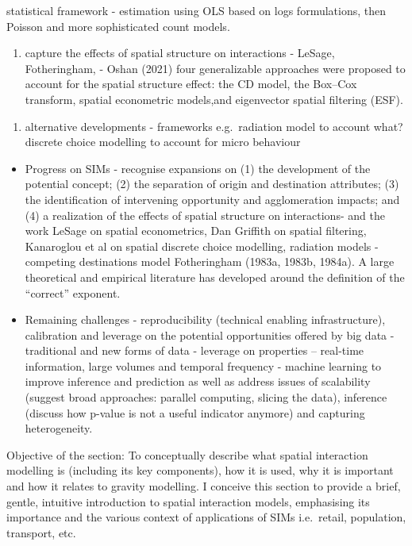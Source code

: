 \documentclass[11pt,letterpaper]{article}
\providecommand{\tightlist}{%
  \setlength{\itemsep}{0pt}\setlength{\parskip}{0pt}}
\begin{document}
statistical framework - estimation using OLS based on logs formulations, then Poisson and more sophisticated count models.

\begin{enumerate}
\def\labelenumi{(\arabic{enumi})}
\tightlist
\item
  capture the effects of spatial structure on interactions - LeSage, Fotheringham, - Oshan (2021) four generalizable approaches were proposed to account for the spatial structure effect: the CD model, the Box--Cox transform, spatial econometric models,and eigenvector spatial filtering (ESF).
\end{enumerate}

\begin{enumerate}
\def\labelenumi{(\arabic{enumi})}
\tightlist
\item
  alternative developments - frameworks e.g.~radiation model to account what? discrete choice modelling to account for micro behaviour
\end{enumerate}

\begin{itemize}
\item
  Progress on SIMs - recognise expansions on (1) the development of the potential concept; (2) the separation of origin and destination attributes; (3) the identification of intervening opportunity and agglomeration impacts; and (4) a realization of the effects of spatial structure on interactions- and the work LeSage on spatial econometrics, Dan Griffith on spatial filtering, Kanaroglou et al on spatial discrete choice modelling, radiation models - competing destinations model Fotheringham (1983a, 1983b, 1984a).
  A large theoretical and empirical literature has developed around the definition of the ``correct'' exponent.
\item
  Remaining challenges - reproducibility (technical enabling infrastructure), calibration and leverage on the potential opportunities offered by big data - traditional and new forms of data - leverage on properties -- real-time information, large volumes and temporal frequency - machine learning to improve inference and prediction as well as address issues of scalability (suggest broad approaches: parallel computing, slicing the data), inference (discuss how p-value is not a useful indicator anymore) and capturing heterogeneity.
\end{itemize}

Objective of the section: To conceptually describe what spatial interaction modelling is (including its key components), how it is used, why it is important and how it relates to gravity modelling.
I conceive this section to provide a brief, gentle, intuitive introduction to spatial interaction models, emphasising its importance and the various context of applications of SIMs i.e.~retail, population, transport, etc.
\end{document}
